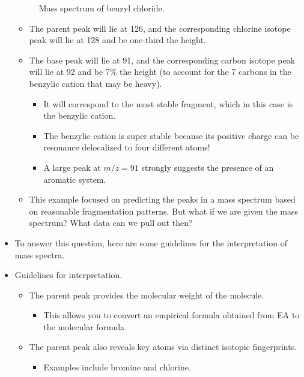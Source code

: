 \documentclass[../notes.tex]{subfiles}
\begin{document}
\begin{itemize}
\begin{figure}[h!]
        \vspace{-0.5em}
        \caption{Mass spectrum of benzyl chloride.}
        \label{fig:MSBnCl}
    \end{figure}
    \begin{itemize}
        \item The parent peak will lie at 126, and the corresponding chlorine isotope peak will lie at 128 and be one-third the height.
        \item The base peak will lie at 91, and the corresponding carbon isotope peak will lie at 92 and be 7\% the height (to account for the 7 carbons in the benzylic cation that may be heavy).
        \begin{itemize}
            \item It will correspond to the most stable fragment, which in this case is the benzylic cation.
            \item The benzylic cation is super stable because its positive charge can be resonance delocalized to four different atoms!
            \item A large peak at $m/z=91$ strongly suggests the presence of an aromatic system.
        \end{itemize}
        \item This example focused on predicting the peaks in a mass spectrum based on reasonable fragmentation patterns. But what if we are given the mass spectrum? What data can we pull out then?
    \end{itemize}
    \item To answer this question, here are some guidelines for the interpretation of mass spectra.
    \item Guidelines for interpretation.
    \begin{itemize}
        \item The parent peak provides the molecular weight of the molecule.
        \begin{itemize}
            \item This allows you to convert an empirical formula obtained from EA to the molecular formula.
        \end{itemize}
        \item The parent peak also reveals key atoms via distinct isotopic fingerprints.
        \begin{itemize}
            \item Examples include bromine and chlorine.

\end{itemize}
\end{itemize}
\end{itemize}
\end{document}
